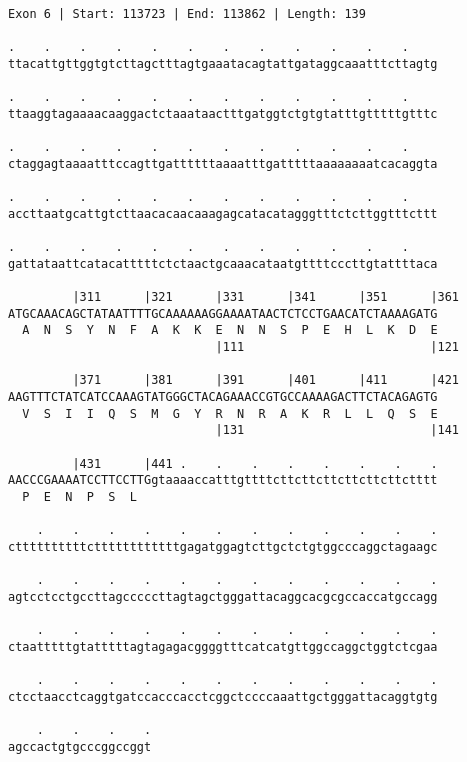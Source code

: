 \documentclass{article}
\begin{document}
\begin{Verbatim}
Exon 6 | Start: 113723 | End: 113862 | Length: 139
 
.    .    .    .    .    .    .    .    .    .    .    .    
ttacattgttggtgtcttagctttagtgaaatacagtattgataggcaaatttcttagtg
  
.    .    .    .    .    .    .    .    .    .    .    .    
ttaaggtagaaaacaaggactctaaataactttgatggtctgtgtatttgtttttgtttc
  
.    .    .    .    .    .    .    .    .    .    .    .    
ctaggagtaaaatttccagttgattttttaaaatttgatttttaaaaaaaatcacaggta
  
.    .    .    .    .    .    .    .    .    .    .    .    
accttaatgcattgtcttaacacaacaaagagcatacatagggtttctcttggtttcttt
  
.    .    .    .    .    .    .    .    .    .    .    .    
gattataattcatacatttttctctaactgcaaacataatgttttcccttgtattttaca
  
         |311      |321      |331      |341      |351      |361
ATGCAAACAGCTATAATTTTGCAAAAAAGGAAAATAACTCTCCTGAACATCTAAAAGATG
  A  N  S  Y  N  F  A  K  K  E  N  N  S  P  E  H  L  K  D  E
                             |111                          |121
  
         |371      |381      |391      |401      |411      |421
AAGTTTCTATCATCCAAAGTATGGGCTACAGAAACCGTGCCAAAAGACTTCTACAGAGTG
  V  S  I  I  Q  S  M  G  Y  R  N  R  A  K  R  L  L  Q  S  E
                             |131                          |141
  
         |431      |441 .    .    .    .    .    .    .    .
AACCCGAAAATCCTTCCTTGgtaaaaccatttgttttcttcttcttcttcttcttctttt
  P  E  N  P  S  L                                          
  
    .    .    .    .    .    .    .    .    .    .    .    .
cttttttttttcttttttttttttgagatggagtcttgctctgtggcccaggctagaagc
  
    .    .    .    .    .    .    .    .    .    .    .    .
agtcctcctgccttagcccccttagtagctgggattacaggcacgcgccaccatgccagg
  
    .    .    .    .    .    .    .    .    .    .    .    .
ctaatttttgtatttttagtagagacggggtttcatcatgttggccaggctggtctcgaa
  
    .    .    .    .    .    .    .    .    .    .    .    .
ctcctaacctcaggtgatccacccacctcggctccccaaattgctgggattacaggtgtg
  
    .    .    .    .
agccactgtgcccggccggt
\end{Verbatim}
\newpage
\end{document}
